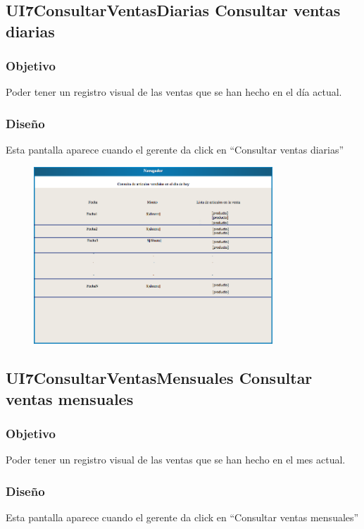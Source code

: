 \subsection{UI7ConsultarVentasDiarias Consultar ventas diarias}
\subsubsection{Objetivo}
Poder tener un registro visual de las ventas que se han hecho en el día actual.
\subsubsection{Diseño}
   Esta pantalla aparece cuando el gerente da click en ``Consultar ventas diarias'' 


\begin{figure}[htbp!]
        \centering
            \includegraphics[width=0.8\textwidth]{images/consultaVentasDia}
            
            
    \end{figure}
    

\subsection{UI7ConsultarVentasMensuales Consultar ventas mensuales}
\subsubsection{Objetivo}
Poder tener un registro visual de las ventas que se han hecho en el mes actual.
\subsubsection{Diseño}
   Esta pantalla aparece cuando el gerente da click en ``Consultar ventas mensuales'' 


